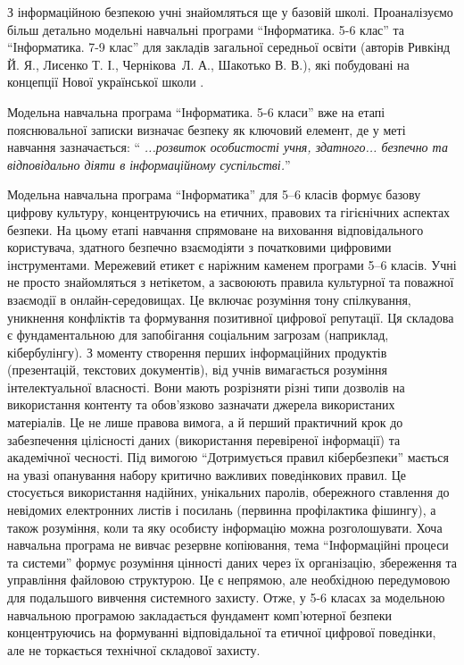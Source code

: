 З інформаційною безпекою учні знайомляться ще у базовій школі.  Проаналізуємо більш детально модельні навчальні програми ``Інформатика. 5-6 клас'' \cite{inform_5_6_rivkind}  та ``Інформатика. 7-9 клас'' \cite{inform_7_9_rivkind} для закладів загальної середньої освіти (авторів  Ривкінд Й. Я., Лисенко Т. І., Чернікова~Л. А., Шакотько В. В.), які побудовані на концепції Нової української школи \cite{nush_mon_compressed}. 

Модельна навчальна програма ``Інформатика. 5-6 класи'' \cite{inform_5_6_rivkind} вже на етапі пояснювальної записки визначає безпеку як ключовий елемент, де у меті навчання зазначається: ``
\textit{...розвиток особистості учня, здатного... безпечно та відповідально діяти в інформаційному суспільстві.}''

Модельна навчальна програма ``Інформатика'' для 5–6 класів формує базову цифрову культуру, концентруючись на етичних, правових та гігієнічних аспектах безпеки. На цьому етапі навчання спрямоване на виховання відповідального користувача, здатного безпечно взаємодіяти з початковими цифровими інструментами. Мережевий етикет є наріжним каменем програми 5–6 класів. Учні не просто знайомляться з нетікетом, а засвоюють правила культурної та поважної взаємодії в онлайн-середовищах. Це включає розуміння тону спілкування, уникнення конфліктів та формування позитивної цифрової репутації. Ця складова є фундаментальною для запобігання соціальним загрозам (наприклад, кібербулінгу). З моменту створення перших інформаційних продуктів (презентацій, текстових документів), від учнів вимагається розуміння інтелектуальної власності. Вони мають розрізняти різні типи дозволів на використання контенту та обов'язково зазначати джерела використаних матеріалів. Це не лише правова вимога, а й перший практичний крок до забезпечення цілісності даних (використання перевіреної інформації) та академічної чесності. Під вимогою ``Дотримується правил кібербезпеки'' мається на увазі опанування набору критично важливих поведінкових правил. Це стосується використання надійних, унікальних паролів, обережного ставлення до невідомих електронних листів і посилань (первинна профілактика фішингу), а також розуміння, коли та яку особисту інформацію можна розголошувати. Хоча навчальна програма не вивчає резервне копіювання, тема ``Інформаційні процеси та системи'' формує розуміння цінності даних через їх організацію, збереження та управління файловою структурою. Це є непрямою, але необхідною передумовою для подальшого вивчення системного захисту. Отже, у 5-6 класах за модельною навчальною програмою  закладається  фундамент комп’ютерної безпеки концентруючись на формуванні відповідальної та етичної цифрової поведінки, але не торкається технічної складової захисту.

